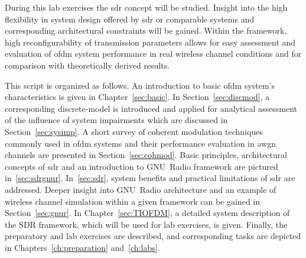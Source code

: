 During this lab exercises the \gls{sdr} concept will be studied. Insight into the high flexibility in system design offered by \gls{sdr} or comparable systems and corresponding architectural constraints will be gained. Within the framework, high reconfigurability of transmission parameters allows for easy assessment and evaluation of \gls{ofdm} system performance in real wireless channel conditions and for comparison with theoretically derived results.

This script is organized as follows. An introduction to basic \gls{ofdm} system's characteristics is given in Chapter~\ref{sec:basic}. In Section~\ref{sec:discmod}, a corresponding discrete-model is introduced and applied for analytical assessment of the influence of system impairments which are discussed in Section~\ref{sec:sysimp}. A short survey of coherent modulation techniques commonly used in \gls{ofdm} systems and their performance evaluation in \gls{awgn} channels are presented in Section~\ref{sec:cohmod}.
Basic principles, architectural concepts of \gls{sdr} and an introduction to GNU~Radio framework are pictured in~\cref{sec:sdrgnur}. In~\cref{sec:sdr}, system benefits and practical limitations of \gls{sdr} are addressed. Deeper insight into GNU~Radio architecture and an example of wireless channel simulation within a given framework can be gained in Section~\ref{sec:gnur}.
In Chapter~\ref{sec:TIOFDM}, a detailed system description of the SDR framework, which will be used for lab exercises, is given.
Finally, the preparatory and lab exercises are described, and corresponding tasks are depicted in Chapters~\ref{ch:preparation} and~\ref{ch:labs}. 






